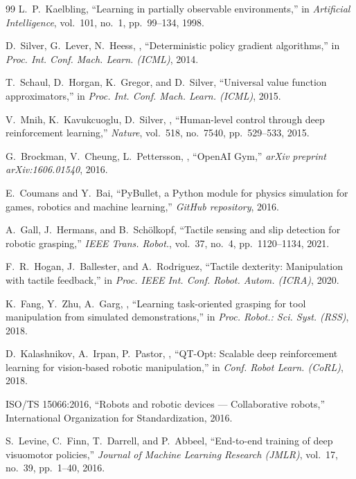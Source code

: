 \documentclass[10pt,twocolumn,a4paper]{article}
\begin{document}
\begin{thebibliography}{99}
L.~P.~Kaelbling, ``Learning in partially observable environments,'' in \textit{Artificial Intelligence}, vol.~101, no.~1, pp.~99--134, 1998.

D.~Silver, G.~Lever, N.~Heess, \etal, ``Deterministic policy gradient algorithms,'' in \textit{Proc. Int. Conf. Mach. Learn. (ICML)}, 2014.

T.~Schaul, D.~Horgan, K.~Gregor, and D.~Silver, ``Universal value function approximators,'' in \textit{Proc. Int. Conf. Mach. Learn. (ICML)}, 2015.

V.~Mnih, K.~Kavukcuoglu, D.~Silver, \etal, ``Human-level control through deep reinforcement learning,'' \textit{Nature}, vol.~518, no.~7540, pp.~529--533, 2015.

G.~Brockman, V.~Cheung, L.~Pettersson, \etal, ``OpenAI Gym,'' \textit{arXiv preprint arXiv:1606.01540}, 2016.

E.~Coumans and Y.~Bai, ``PyBullet, a Python module for physics simulation for games, robotics and machine learning,'' \textit{GitHub repository}, 2016.

A.~Gall, J.~Hermans, and B.~Schölkopf, ``Tactile sensing and slip detection for robotic grasping,'' \textit{IEEE Trans. Robot.}, vol.~37, no.~4, pp.~1120--1134, 2021.

F.~R.~Hogan, J.~Ballester, and A.~Rodriguez, ``Tactile dexterity: Manipulation with tactile feedback,'' in \textit{Proc. IEEE Int. Conf. Robot. Autom. (ICRA)}, 2020.

K.~Fang, Y.~Zhu, A.~Garg, \etal, ``Learning task-oriented grasping for tool manipulation from simulated demonstrations,'' in \textit{Proc. Robot.: Sci. Syst. (RSS)}, 2018.

D.~Kalashnikov, A.~Irpan, P.~Pastor, \etal, ``QT-Opt: Scalable deep reinforcement learning for vision-based robotic manipulation,'' in \textit{Conf. Robot Learn. (CoRL)}, 2018.

ISO/TS 15066:2016, ``Robots and robotic devices — Collaborative robots,'' International Organization for Standardization, 2016.

S.~Levine, C.~Finn, T.~Darrell, and P.~Abbeel, ``End-to-end training of deep visuomotor policies,'' \textit{Journal of Machine Learning Research (JMLR)}, vol.~17, no.~39, pp.~1--40, 2016.
\end{thebibliography}
\end{document}
